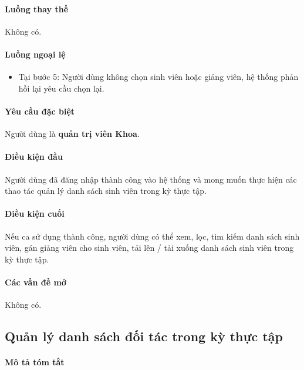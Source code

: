 \documentclass[./../main.tex]{subfiles}
\begin{document}
\paragraph*{Luồng thay thế} Không có.

\paragraph*{Luồng ngoại lệ}

\begin{itemize}
  \item
    
  Tại bước 5: Người dùng không chọn sinh viên hoặc giảng viên, hệ thống phản hồi lại yêu cầu chọn lại.
  
\end{itemize}

\paragraph*{Yêu cầu đặc biệt}

Người dùng là \textbf{quản trị viên Khoa}.

\paragraph*{Điều kiện đầu}

Người dùng đã đăng nhập thành công vào hệ thống và mong muốn thực hiện các thao tác quản lý danh sách sinh viên trong kỳ thực tập.

\paragraph*{Điều kiện cuối}

Nếu ca sử dụng thành công, người dùng có thể xem, lọc, tìm kiếm danh sách sinh viên, gán giảng viên cho sinh viên, tải lên / tải xuống danh sách sinh viên trong kỳ thực tập.

\paragraph*{Các vấn đề mở}

Không có.

\subsection{Quản lý danh sách đối tác trong kỳ thực tập}

\paragraph*{Mô tả tóm tắt}
\end{document}
